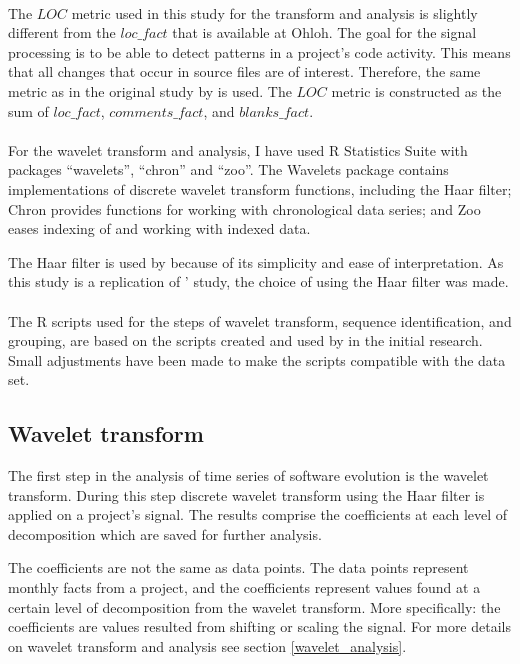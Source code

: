 \paragraph{}
The $LOC$ metric used in this study for the transform and analysis is slightly
different from the $loc\_fact$ that is available at Ohloh. The goal for the
signal processing is to be able to detect patterns in a project's code
activity. This means that all changes that occur in source files are of
interest. Therefore, the same metric as in the original study by
\citet{karus2013} is used. The $LOC$ metric is constructed as the sum of
$loc\_fact$, $comments\_fact$, and $blanks\_fact$.

\paragraph{}
For the wavelet transform and analysis, I have used R Statistics Suite
with packages ``wavelets'', ``chron'' and ``zoo''. The Wavelets package
contains implementations of discrete wavelet transform functions, including
the Haar filter; Chron provides functions for working with chronological data
series; and Zoo eases indexing of and working with indexed data.

The Haar filter is used by \citet{karus2013} because of its simplicity and ease
of interpretation. As this study is a replication of \citeauthor{karus2013}'
study, the choice of using the Haar filter was made.

\paragraph{}
The R scripts used for the steps of wavelet transform, sequence identification,
and grouping, are based on the scripts created and used by
\citeauthor{karus2013} in the initial research. Small adjustments have been
made to make the scripts compatible with the data set.

\subsection{Wavelet transform}
The first step in the analysis of time series of software evolution is the
wavelet transform. During this step discrete wavelet transform using the Haar
filter is applied on a project's signal. The results comprise the
coefficients at each level of decomposition which are saved for further
analysis.

The coefficients are not the same as data points. The data points represent
monthly facts from a project, and the coefficients represent values found at a
certain level of decomposition from the wavelet transform. More specifically:
the coefficients are values resulted from shifting or scaling the signal. For
more details on wavelet transform and analysis see section
\ref{wavelet_analysis}.

